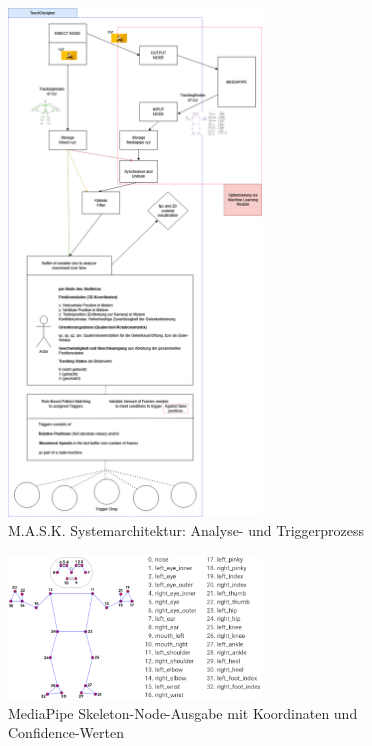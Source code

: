 \begin{figure}[!htbp]
    \centering
    \includegraphics[width=0.6\textwidth,height=0.25\textheight,keepaspectratio]{images/MASK.png}
    \caption{M.A.S.K. Systemarchitektur: Analyse- und Triggerprozess}
    \label{fig:mask_architecture}
\end{figure}

\begin{figure}[!htbp]
    \centering
    \includegraphics[width=0.6\textwidth,height=0.25\textheight,keepaspectratio]{images/mediapipeNODES.png}
    \caption{MediaPipe Skeleton-Node-Ausgabe mit Koordinaten und Confidence-Werten}
    \label{fig:mediapipe_nodes}
\end{figure}

